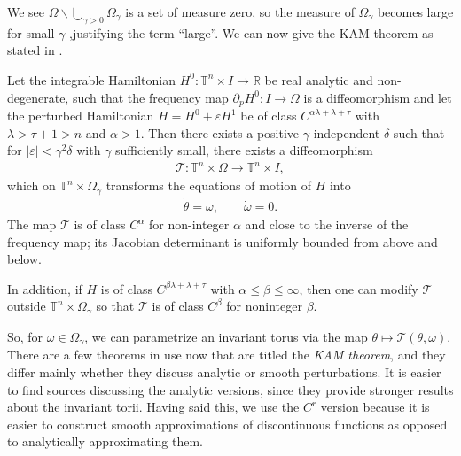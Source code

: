 We see $\Omega\backslash \bigcup_{\gamma>0}\Omega_\gamma$ is a set of measure zero, so the measure of $\Omega_\gamma$ becomes large for small $\gamma$ ,justifying the term ``large''. We can now give the KAM theorem as stated in \cite{poschel82}.

\begin{theorem}\label{thm:KAM}
Let the integrable Hamiltonian $H^0:\mathbb T^n\times I\to\mathbb R$ be real analytic and non-degenerate, such that the frequency map $\partial_p H^0:I\to\Omega$ is a diffeomorphism and let the perturbed Hamiltonian $H=H^0+\varepsilon H^1$ be of class $C^{\alpha\lambda+\lambda+\tau}$ with $\lambda>\tau+1>n$ and $\alpha>1$. Then there exists a positive $\gamma$-independent $\delta$ such that for $|\varepsilon|<\gamma^2\delta$ with $\gamma$ sufficiently small, there exists a diffeomorphism
\begin{align*}
\mathcal T: \mathbb T^n\times\Omega \to\mathbb T^n\times I,
\end{align*} 
which on $\mathbb T^n\times\Omega_\gamma$ transforms the equations of motion of $H$ into
\begin{align*}
\dot \theta=\omega,\qquad \dot\omega=0.
\end{align*}
The map $\mathcal T$ is of class $C^\alpha$ for non-integer $\alpha$ and close to the inverse of the frequency map; its Jacobian determinant is uniformly bounded from above and below.

In addition, if $H$ is of class $C^{\beta\lambda+\lambda+\tau}$ with $\alpha\le\beta\le\infty$, then one can modify $\mathcal T$ outside $\mathbb T^n\times\Omega_\gamma$ so that $\mathcal T$ is of class $C^\beta$ for noninteger $\beta$.
\end{theorem}

So, for $\omega\in\Omega_\gamma$, we can parametrize an invariant torus via the map $\theta\mapsto\mathcal T(\theta,\omega)$. There are a few theorems in use now that are titled the \textit{KAM theorem}, and they differ mainly whether they discuss analytic or smooth perturbations. It is easier to find sources discussing the analytic versions, since they provide stronger results about the invariant torii. Having said this, we use the $C^r$ version because it is easier to construct smooth approximations of discontinuous functions as opposed to analytically approximating them.

